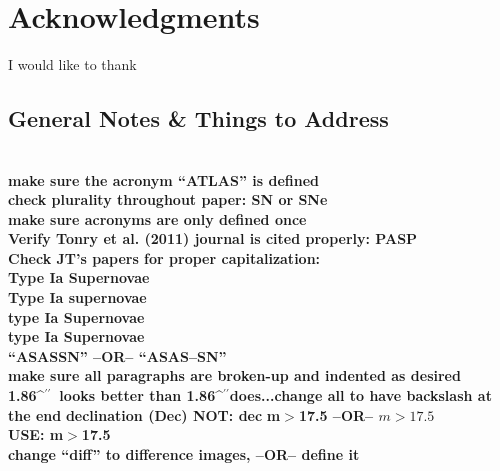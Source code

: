 \documentclass[aps,prb,twocolumn,superscriptaddress]{revtex4-1}
\def\arcsec{\ifmmode^{\prime\prime}\else$^{\prime\prime}$\fi}
\begin{document}
\section*{Acknowledgments}
I would like to thank   %



\clearpage
\begin{widetext} %
 \section{General Notes \& Things to Address}
 \\
 {\bf make sure the acronym ``ATLAS'' is defined\\}
 {\bf check plurality throughout paper: SN or SNe\\}
 {\bf make sure acronyms are only defined once\\}
 {\bf Verify Tonry et al. (2011) journal is cited properly: PASP\\}
 {\bf Check JT's papers for proper capitalization:\\
 \indent Type Ia Supernovae\\
 \indent Type Ia supernovae\\
 \indent type Ia Supernovae\\
 \indent type Ia Supernovae\\}
 {\bf ``ASASSN'' --OR-- ``ASAS--SN''\\}
 {\bf make sure all paragraphs are broken-up and indented as desired\\}
 {\bf 1.86\arcsec\ looks better than 1.86\arcsec does...change all to have backslash at the end}
 {\bf declination (Dec) NOT: dec}
 {\bf m$>$17.5 --OR-- $m>17.5$\\
 \indent USE: m$>$17.5}\\
 {\bf change ``diff'' to difference images, --OR-- define it}\\ 
\end{widetext}
\end{document}
